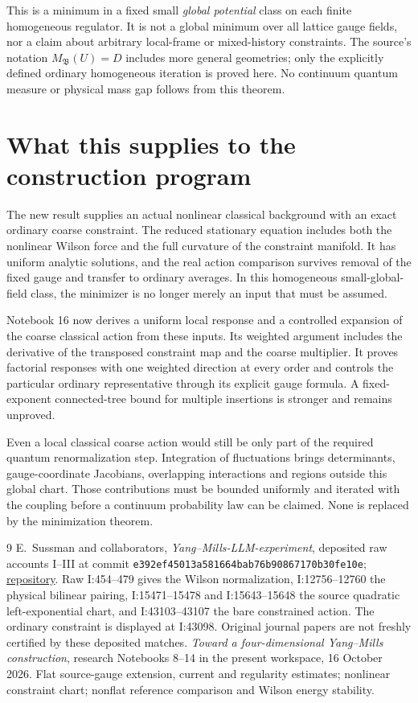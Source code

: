 \documentclass[11pt]{article}
\theoremstyle{remark}
\begin{document}
This is a minimum in a fixed small \emph{global potential}
class on each finite homogeneous regulator. It is not a
global minimum over all lattice gauge fields, nor a claim
about arbitrary local-frame or mixed-history constraints.
The source's notation $M_{\mathfrak B}(U)=D$ includes more
general geometries; only the explicitly defined ordinary
homogeneous iteration is proved here. No continuum quantum
measure or physical mass gap follows from this theorem.


\section{What this supplies to the construction program}
\label{nm15-ledger}

The new result supplies an actual nonlinear classical background
with an exact ordinary coarse constraint. The reduced stationary
equation includes both the nonlinear Wilson force and the full
curvature of the constraint manifold. It has uniform analytic
solutions, and the real action comparison survives removal of
the fixed gauge and transfer to ordinary averages. In this
homogeneous small-global-field class, the minimizer is no longer
merely an input that must be assumed.

Notebook 16 now derives a uniform local response and a controlled
expansion of the coarse classical action from these inputs.
Its weighted argument includes the derivative of the transposed
constraint map and the coarse multiplier. It proves factorial
responses with one weighted direction at every order and controls
the particular ordinary representative through its explicit gauge
formula. A fixed-exponent connected-tree bound for multiple
insertions is stronger and remains unproved.

Even a local classical coarse action would still be only part
of the required quantum renormalization step. Integration of
fluctuations brings determinants, gauge-coordinate Jacobians,
overlapping interactions and regions outside this global chart.
Those contributions must be bounded uniformly and iterated
with the coupling before a continuum probability law can be
claimed. None is replaced by the minimization theorem.

\begin{thebibliography}{9}
E.~Sussman and collaborators, \emph{Yang--Mills-LLM-experiment},
deposited raw accounts I--III at commit
\texttt{e392ef45013a581664bab76b90867170b30fe10e};
\href{https://github.com/ethanwsussman/Yang--Mills-LLM-experiment}{repository}.
Raw I:454--479 gives the Wilson normalization,
I:12756--12760 the physical bilinear pairing,
I:15471--15478 and I:15643--15648 the source quadratic
left-exponential chart, and I:43103--43107 the bare
constrained action. The ordinary constraint is displayed
at I:43098. Original journal papers are not freshly
certified by these deposited matches.
\emph{Toward a four-dimensional Yang--Mills construction},
research Notebooks 8--14 in the present workspace,
16 October 2026. Flat source-gauge extension, current and
regularity estimates; nonlinear constraint chart; nonflat
reference comparison and Wilson energy stability.
\end{thebibliography}
\end{document}
